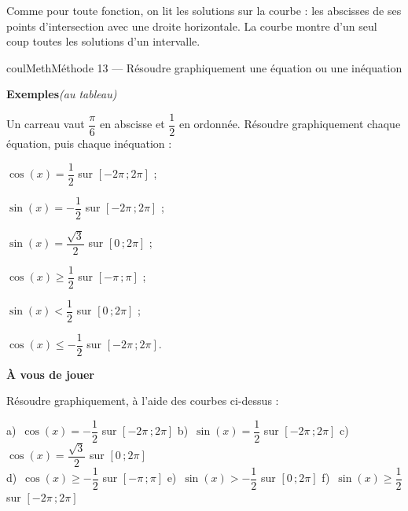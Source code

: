 \documentclass[11pt,a4paper]{article}
\makeatletter
\renewcommand{\le}{\leqslant}
\renewcommand{\ge}{\geqslant}
\newcommand{\lycee@intff}[2]{\left[#1\,;#2\right]}
\providecommand{\intff}{\lycee@intff}%
\newcounter{lycee@signet}
\newcommand{\signet}[3][]{\stepcounter{lycee@signet}%
  \edef\lycee@dest{\if\relax\detokenize{#1}\relax
    signet.\arabic{lycee@signet}\else#1\fi}%
  \hypertarget{\lycee@dest}{}\bookmark[level=#2,dest=\lycee@dest]{#3}}
\newcounter{methode}
\newenvironment{methodebox}[1][Méthode]{\stepcounter{methode}%
  \begin{boitecours}[phantom={\signet[methode-\arabic{methode}]{2}{#1}}]{coulMeth}{#1}}%
  {\end{boitecours}}
\newcommand{\etape}[1]{\par\smallskip\textbf{\color{coulMeth}#1}\par\nobreak\smallskip}
\newcommand{\autableau}{\hfill{\footnotesize\itshape\color{black!45}(au tableau)}}
\newcommand{\etapeexemples}{%
    \par\smallskip\textbf{\color{coulMeth}Exemples}\autableau\par\nobreak\smallskip}
\makeatother
\begin{document}
Comme pour toute fonction, on lit les solutions sur la courbe : les abscisses de ses points
d'intersection avec une droite horizontale. La courbe montre d'un seul coup toutes les
solutions d'un intervalle.

\begin{methodebox}[Méthode 13 --- Résoudre graphiquement une équation ou une inéquation]
\etapeexemples
Un carreau vaut $\dfrac{\pi}{6}$ en abscisse et $\dfrac{1}{2}$ en ordonnée. Résoudre graphiquement chaque équation, puis chaque inéquation :
\begin{questions}[label=\alph*)]
  \item $\cos(x)=\dfrac{1}{2}$ sur $\intff{-2\pi}{2\pi}$ ;
  \item $\sin(x)=-\dfrac{1}{2}$ sur $\intff{-2\pi}{2\pi}$ ;
  \item $\sin(x)=\dfrac{\sqrt{3}}{2}$ sur $\intff{0}{2\pi}$ ;
  \item $\cos(x)\ge\dfrac{1}{2}$ sur $\intff{-\pi}{\pi}$ ;
  \item $\sin(x)<\dfrac{1}{2}$ sur $\intff{0}{2\pi}$ ;
  \item $\cos(x)\le-\dfrac{1}{2}$ sur $\intff{-2\pi}{2\pi}$.
\end{questions}
\begin{center}

\medskip
{}
\end{center}

\etape{À vous de jouer}
Résoudre graphiquement, à l'aide des courbes ci-dessus :
\begin{center}
a)~$\cos(x)=-\dfrac{1}{2}$ sur $\intff{-2\pi}{2\pi}$ \qquad
b)~$\sin(x)=\dfrac{1}{2}$ sur $\intff{-2\pi}{2\pi}$ \qquad
c)~$\cos(x)=\dfrac{\sqrt{3}}{2}$ sur $\intff{0}{2\pi}$\\[4pt]
d)~$\cos(x)\ge-\dfrac{1}{2}$ sur $\intff{-\pi}{\pi}$ \qquad
e)~$\sin(x)>-\dfrac{1}{2}$ sur $\intff{0}{2\pi}$ \qquad
f)~$\sin(x)\ge\dfrac{1}{2}$ sur $\intff{-2\pi}{2\pi}$
\end{center}

\end{methodebox}
\end{document}
